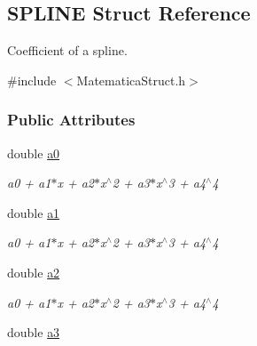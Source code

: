 \hypertarget{structSPLINE}{\subsection{\-S\-P\-L\-I\-N\-E \-Struct \-Reference}
\label{structSPLINE}
}


\-Coefficient of a spline.  




{\ttfamily \#include $<$\-Matematica\-Struct.\-h$>$}

\subsubsection*{\-Public \-Attributes}
\begin{DoxyCompactItemize}
\item 
\hypertarget{structSPLINE_ad95dcba445836b4ba94129111a4b888c}{double \hyperlink{structSPLINE_ad95dcba445836b4ba94129111a4b888c}{a0}}\label{structSPLINE_ad95dcba445836b4ba94129111a4b888c}

\begin{DoxyCompactList}\small\item\em a0 + a1$\ast$x + a2$\ast$x$^\wedge$2 + a3$\ast$x$^\wedge$3 + a4$^\wedge$4 \end{DoxyCompactList}\item 
\hypertarget{structSPLINE_a5d015a3751aec61f2442b957cb6f517a}{double \hyperlink{structSPLINE_a5d015a3751aec61f2442b957cb6f517a}{a1}}\label{structSPLINE_a5d015a3751aec61f2442b957cb6f517a}

\begin{DoxyCompactList}\small\item\em a0 + a1$\ast$x + a2$\ast$x$^\wedge$2 + a3$\ast$x$^\wedge$3 + a4$^\wedge$4 \end{DoxyCompactList}\item 
\hypertarget{structSPLINE_ac55c2d269ed76bd9bdb7fb25f3533a4e}{double \hyperlink{structSPLINE_ac55c2d269ed76bd9bdb7fb25f3533a4e}{a2}}\label{structSPLINE_ac55c2d269ed76bd9bdb7fb25f3533a4e}

\begin{DoxyCompactList}\small\item\em a0 + a1$\ast$x + a2$\ast$x$^\wedge$2 + a3$\ast$x$^\wedge$3 + a4$^\wedge$4 \end{DoxyCompactList}\item 
\hypertarget{structSPLINE_aac922a785af4fb14fc828152cd94c34e}{double \hyperlink{structSPLINE_aac922a785af4fb14fc828152cd94c34e}{a3}}\label{structSPLINE_aac922a785af4fb14fc828152cd94c34e}


\end{DoxyCompactItemize}
